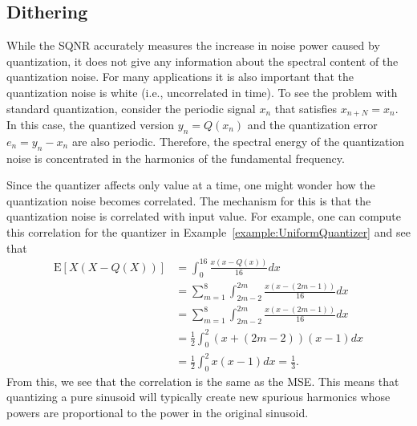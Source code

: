 \subsection{Dithering}

While the SQNR accurately measures the increase in noise power caused by quantization, it does not give any information about the spectral content of the quantization noise.
For many applications it is also important that the quantization noise is white (i.e., uncorrelated in time).
To see the problem with standard quantization, consider the periodic signal $x_n$ that satisfies $x_{n+N} = x_n$.
In this case, the quantized version $y_n = Q(x_n)$ and the quantization error $e_n = y_n - x_n$ are also periodic.
Therefore, the spectral energy of the quantization noise is concentrated in the harmonics of the fundamental frequency.

Since the quantizer affects only value at a time, one might wonder how the quantization noise becomes correlated.
The mechanism for this is that the quantization noise is correlated with input value.
For example, one can compute this correlation for the quantizer in Example~\ref{example:UniformQuantizer} and see that
\begin{align*}
\mathrm{E} \left[X \left(X - Q(X)\right) \right] 
&= \int_0^{16} \frac{x(x - Q(x))}{16} dx \\
&= \sum_{m=1}^8 \int_{2m-2}^{2m} \frac{x(x - (2m - 1))}{16} dx \\
&= \sum_{m=1}^8 \int_{2m-2}^{2m} \frac{x(x - (2m - 1))}{16} dx \\
&= \frac{1}{2} \int_{0}^{2} (x+(2m-2))(x - 1) dx \\
&= \frac{1}{2} \int_{0}^{2} x(x - 1) dx = \frac{1}{3}.
\end{align*}
From this, we see that the correlation is the same as the MSE.
This means that quantizing a pure sinusoid will typically create new spurious harmonics whose powers are proportional to the power in the original sinusoid.

